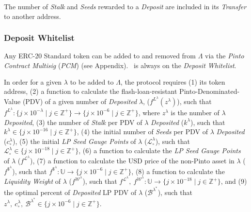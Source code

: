 \documentclass[tikz]{article}
\newcommand{\term}[1]{\textsl{#1}}
\newcommand{\Pinto}{} %
\begin{document}
\vspace*{1.2mm}

The number of \term{Stalk} and \term{Seeds} rewarded to a \term{Deposit} are included in its \term{Transfer} to another address.


\vspace*{1.2mm}
\subsubsection{Deposit Whitelist}
\vspace*{1.2mm}

Any ERC-20 Standard token can be added to and removed from $\Lambda$ via the \term{Pinto Contract Multisig} (\term{PCM}) (see Appendix). \Pinto\ is always on the \term{Deposit Whitelist}.

\vspace*{1.2mm}

In order for a given $\lambda$ to be added to $\Lambda$, the protocol requires 
(1) its token address, 
(2) a function to calculate the flash-loan-resistant Pinto-Denominated-Value (PDV) of a given number of \term{Deposited} $\lambda$, ($f^{L^{\lambda}}(z^{\lambda})$), such that $f^{L^{\lambda}}\colon \{j \times 10^{-\lambda} \mid j \in \mathbb{Z}^{+} \} \rightarrow \{j \times 10^{-6} \mid j \in \mathbb{Z}^{+} \}$, where $z^{\lambda}$ is the number of $\lambda$ \term{Deposited}, 
(3) the number of \term{Stalk} per PDV of $\lambda$ \term{Deposited} ($k^{\lambda}$), such that $k^{\lambda} \in \{j \times 10^{-16} \mid j \in \mathbb{Z}^{+} \}$, 
(4) the initial number of \term{Seeds} per PDV of $\lambda$ \term{Deposited} ($c_{\circ}^{\lambda}$),
(5) the initial \term{LP Seed Gauge Points} of $\lambda$ ($\mathscr{L}_{\circ}^{\lambda}$), such that $\mathscr{L}_{\circ}^{\lambda} \in \{j \times 10^{-18} \mid j \in \mathbb{Z}^{+} \}$,
(6) a function to calculate the \term{LP Seed Gauge Points} of $\lambda$ ($f^{\mathscr{L}^{\lambda}}$), 
(7) a function to calculate the USD price of the non-Pinto asset in $\lambda$ ($f^{\$^{\lambda}}$), such that $f^{\$^{\lambda}} \colon \mathbb{U} \rightarrow \{j \times 10^{-6} \mid j \in \mathbb{Z}^{+} \}$,
(8) a function to calculate the \term{Liquidity Weight} of $\lambda$ ($f^{\mathscr{W}^{\lambda}}$), such that $f^{\mathscr{L}^{\lambda}},\ f^{\mathscr{W}^{\lambda}} \colon \mathbb{U} \rightarrow \{j \times 10^{-18} \mid j \in \mathbb{Z}^{+} \}$, and
(9) the optimal percent of \term{Deposited} LP PDV of $\lambda$ ($\mathscr{B}^{\lambda^{*}}$), such that $z^{\lambda},\ c_{\circ}^{\lambda},\ \mathscr{B}^{\lambda^{*}} \in \{j \times 10^{-6} \mid j \in \mathbb{Z}^{+} \}$.
\end{document}
